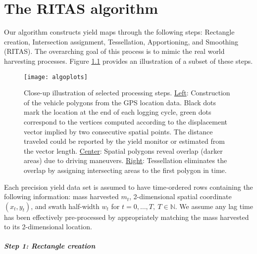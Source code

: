 \chapter{The RITAS algorithm}
\label{sec:ritas}

Our algorithm constructs yield maps through the following steps:
Rectangle creation, Intersection assignment, Tessellation,
Apportioning, and Smoothing (RITAS). The overarching goal of this
process is to mimic the real world harvesting processes. Figure
\ref{fig:closeup} provides an illustration of a subset of these steps.

\begin{figure}[h!]  \centering
  \texttt{[image: algoplots]}
  \caption[Close-up illustration of selected algorithm steps]{Close-up
    illustration of selected processing steps. \underline{Left}:
    Construction of the vehicle polygons from the GPS location
    data. Black dots mark the location at the end of each logging
    cycle, green dots correspond to the vertices computed according to
    the displacement vector implied by two consecutive spatial
    points. The distance traveled could be reported by the yield
    monitor or estimated from the vector length. \underline{Center}:
    Spatial polygons reveal overlap (darker areas) due to driving
    maneuvers. \underline{Right}: Tessellation eliminates the overlap
    by assigning intersecting areas to the first polygon in time.}
    \label{fig:closeup}
\end{figure}

Each precision yield data set is assumed to have time-ordered rows
containing the following information: mass harvested $m_t$,
2-dimensional spatial coordinate $(x_t,y_t)$, and swath half-width
$w_t$ for $t=0,\ldots,T, \ T \in \mathbb{N}$.  We assume any lag time
has been effectively pre-processed by appropriately matching the mass
harvested to its 2-dimensional location.

\paragraph*{Step 1: Rectangle creation}


